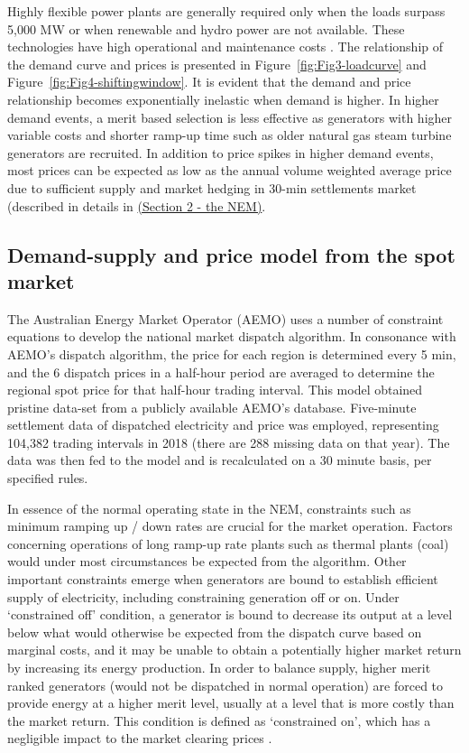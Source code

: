 \documentclass{pasa}%
\begin{document}
Highly flexible power plants are generally required only when the loads surpass 5,000 MW or when renewable and hydro power are not available.  These technologies have high  operational and maintenance costs \cite{aer2018}. The relationship of the demand curve and prices is presented in Figure~\ref{fig:Fig3-loadcurve} and Figure~\ref{fig:Fig4-shiftingwindow}. It is evident that the demand and price relationship becomes exponentially inelastic when demand is higher. In higher demand events, a merit based selection is less effective as generators with higher variable costs and shorter ramp-up time such as older natural gas steam turbine generators are recruited. In addition to price spikes in higher demand events, most prices can be expected as low as the annual volume weighted average price due to sufficient supply and market hedging in 30-min settlements market (described in details in \hyperref[sec:NEM]{(Section 2 - the NEM)}.

\subsection{Demand-supply and price model from the spot market}
\label{sec:model4.2}

The Australian Energy Market Operator (AEMO) uses a number of constraint equations to develop the national market dispatch algorithm. In consonance with  AEMO's dispatch algorithm, the price for each region is determined every 5 min, and the 6 dispatch prices in a half-hour period are averaged to determine the regional spot price for that half-hour trading interval. This model obtained pristine data-set from a publicly available AEMO's database. Five-minute settlement data of dispatched electricity and price was employed, representing 104,382 trading intervals in 2018 (there are 288 missing data on that year). The data was then fed to the model and is recalculated on a 30 minute basis, per specified rules.

In essence of the normal operating state in the NEM, constraints such as minimum ramping up / down rates are crucial for the market operation. Factors concerning operations of long ramp-up rate plants such as thermal plants (coal) would under most circumstances be expected from the algorithm. Other important constraints emerge when generators are bound to establish efficient supply of electricity, including constraining generation off or on. Under `constrained off' condition, a generator is bound to decrease its output at a level below what would otherwise be expected from the dispatch curve based on marginal costs, and it may be unable to obtain a potentially higher market return by increasing its energy production. In order to balance supply, higher merit ranked generators (would not be dispatched in normal operation) are forced to provide energy at a higher merit level, usually at a level that is more costly than the market return. This condition is defined as `constrained on', which has a negligible impact to the market clearing prices \cite{aemoconstraint2013}.
\end{document}
